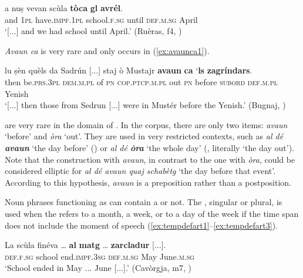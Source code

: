 \ea
\label{ex:toca1}
\gll [...] a nuṣ vevan scùla \textbf{tòca} \textbf{gl} \textbf{avrél}.\\
{} and \textsc{1pl} have.\textsc{impf.1pl} school.\textsc{f.sg} until \textsc{def.m.sg} April\\
\glt `[...] and we had school until April.' (Ruèras, f4, )
\z

\textit{Avaun ca} is very rare and only occurs in \citet{Büchli1966} (\ref{ex:avaunca1}).

\ea
\label{ex:avaunca1}
\gll [...] lu ṣèn quèls da Sadrún [...] staj ò Mustajr \textbf{avaun} \textbf{ca} `\textbf{ls} \textbf{zagríndars}.\\
{} then be.\textsc{prs.3pl} \textsc{dem.m.pl} of \textsc{pn} {} \textsc{cop.ptcp.m.pl} out \textsc{pn} before \textsc{subord} \textsc{def.m.pl} Yenish\\
\glt `[...] then those from Sedrun [...] were in Mustér before the Yenish.' (Bugnaj, \citealt[132]{Büchli1966})
\z

 are very rare in the domain of . In the corpus, there are only two items: \textit{avaun} `before' and \textit{òra} `out'. They are used in very restricted contexts, such as \textit{al dé \textbf{avaun}} `the day before' () or \textit{al dé \textbf{òra}} `the whole day' (, literally `the day out'). Note that the construction with \textit{avaun}, in contrast to the one with \textit{òra}, could be considered elliptic for \textit{al dé avaun quaj schabètg} `the day before that event'. According to this hypothesis, \textit{avaun} is a preposition rather than a postposition.

Noun phrases functioning as  can contain a  or not. The , singular or plural, is used when the  refers to a month, a week, or to a day of the week if the time span does not include the moment of speech (\ref{ex:tempdefart1}--\ref{ex:tempdefart3}).

\ea
\label{ex:tempdefart1}
\gll  La scùla finéva … \textbf{al} \textbf{matg} … \textbf{zarcladur} [...].  \\
\textsc{def.f.sg} school end.\textsc{impf.3sg} {} \textsc{def.m.sg} May {} June.\textsc{m.sg}\\
\glt `School ended in May ... June [...].' (Cavòrgja, m7, )
\z

